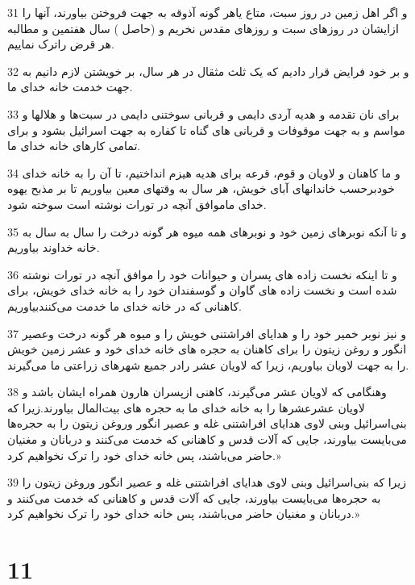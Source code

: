 \par 31 و اگر اهل زمین در روز سبت، متاع یاهر گونه آذوقه به جهت فروختن بیاورند، آنها را ازایشان در روزهای سبت و روزهای مقدس نخریم و (حاصل ) سال هفتمین و مطالبه هر قرض راترک نماییم.
\par 32 و بر خود فرایض قرار دادیم که یک ثلث مثقال در هر سال، بر خویشتن لازم دانیم به جهت خدمت خانه خدای ما.
\par 33 برای نان تقدمه و هدیه آردی دایمی و قربانی سوختنی دایمی در سبت‌ها و هلالها و مواسم و به جهت موقوفات و قربانی های گناه تا کفاره به جهت اسرائیل بشود و برای تمامی کارهای خانه خدای ما.
\par 34 و ما کاهنان و لاویان و قوم، قرعه برای هدیه هیزم انداختیم، تا آن را به خانه خدای خودبرحسب خاندانهای آبای خویش، هر سال به وقتهای معین بیاوریم تا بر مذبح یهوه خدای ماموافق آنچه در تورات نوشته است سوخته شود.
\par 35 و تا آنکه نوبرهای زمین خود و نوبرهای همه میوه هر گونه درخت را سال به سال به خانه خداوند بیاوریم.
\par 36 و تا اینکه نخست زاده های پسران و حیوانات خود را موافق آنچه در تورات نوشته شده است و نخست زاده های گاوان و گوسفندان خود را به خانه خدای خویش، برای کاهنانی که در خانه خدای ما خدمت می‌کنندبیاوریم.
\par 37 و نیز نوبر خمیر خود را و هدایای افراشتنی خویش را و میوه هر گونه درخت وعصیر انگور و روغن زیتون را برای کاهنان به حجره های خانه خدای خود و عشر زمین خویش را به جهت لاویان بیاوریم، زیرا که لاویان عشر رادر جمیع شهرهای زراعتی ما می‌گیرند.
\par 38 وهنگامی که لاویان عشر می‌گیرند، کاهنی ازپسران هارون همراه ایشان باشد و لاویان عشرعشرها را به خانه خدای ما به حجره های بیت‌المال بیاورند.زیرا که بنی‌اسرائیل وبنی لاوی هدایای افراشتنی غله و عصیر انگور وروغن زیتون را به حجره‌ها می‌بایست بیاورند، جایی که آلات قدس و کاهنانی که خدمت می‌کنند و دربانان و مغنیان حاضر می‌باشند، پس خانه خدای خود را ترک نخواهیم کرد.»
\par 39 زیرا که بنی‌اسرائیل وبنی لاوی هدایای افراشتنی غله و عصیر انگور وروغن زیتون را به حجره‌ها می‌بایست بیاورند، جایی که آلات قدس و کاهنانی که خدمت می‌کنند و دربانان و مغنیان حاضر می‌باشند، پس خانه خدای خود را ترک نخواهیم کرد.»
 
\chapter{11}

